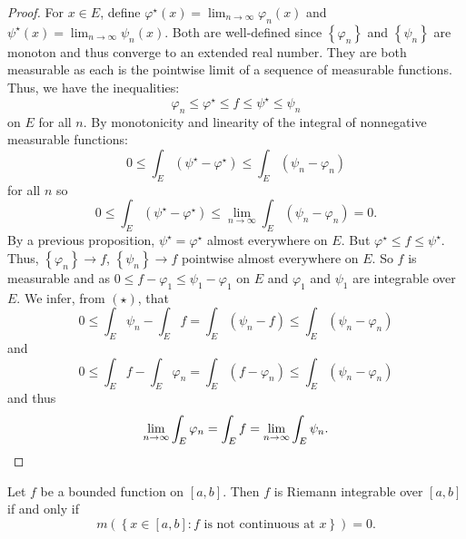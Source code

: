 \begin{proof}
	For $x \in E$, define $\varphi^\star(x) = \lim_{n \to \infty} \varphi_n(x)$
	and $\psi^\star(x) = \lim_{n \to \infty} \psi_n(x)$.
	Both are well-defined since 
	$\left\{ \varphi_n \right\}$ and $\left\{ \psi_n \right\}$
	are monoton and thus converge to an extended real number.
	They are both measurable as each is the pointwise limit of a sequence
	of measurable functions.
	Thus, we have the inequalities:
	\[
		\varphi_n \leq \varphi^\star \leq f \leq \psi^\star \leq
		\psi_n \tag{$\star$}
	\]
	on $E$ for all $n$.
	By monotonicity and linearity of the integral of nonnegative measurable
	functions:
	\[
		0 \leq \int_E (\psi^\star - \varphi^\star)
		\leq \int_E (\psi_n - \varphi_n)
	\]
	for all $n$ so
	\[
		0 \leq \int_E (\psi^\star - \varphi^\star)
		\leq \lim_{n \to \infty} \int_E (\psi_n - \varphi_n) = 0.
	\]
	By a previous proposition, $\psi^\star = \varphi^\star$ almost everywhere
	on $E$.
	But $\varphi^\star \leq f \leq \psi^\star$.
	Thus, $\left\{ \varphi_n \right\} \to f$,
	$\left\{ \psi_n \right\} \to f$ pointwise almost everywhere on $E$.
	So $f$ is measurable and as $0 \leq f - \varphi_1 \leq \psi_1 - \varphi_1$
	on $E$ and $\varphi_1$ and $\psi_1$ are integrable over $E$.
	We infer, from $(\star)$, that
	\[
		0 \leq \int_E \psi_n - \int_E f
		= \int_E (\psi_n - f)
		\leq \int_E (\psi_n - \varphi_n)
	\]
	and
	\[
		0 \leq \int_E f - \int_E \varphi_n
		= \int_E (f - \varphi_n)
		\leq \int_E (\psi_n - \varphi_n)
	\]
	and thus
	\[
		\lim_{n \to \infty} \int_E \varphi_n
		= \int_E f
		= \lim_{n \to \infty} \int_E \psi_n. \qedhere
	\]
\end{proof}

\begin{theorem}[Lebesgue]
	Let $f$ be a bounded function on $[a,b]$.
	Then $f$ is Riemann integrable over $[a,b]$ if and only if
	\[
		m\left( \left\{ 
			x \in [a,b]: \text{$f$ is not continuous at $x$} 
		\right\} \right) = 0.
	\]
\end{theorem}

